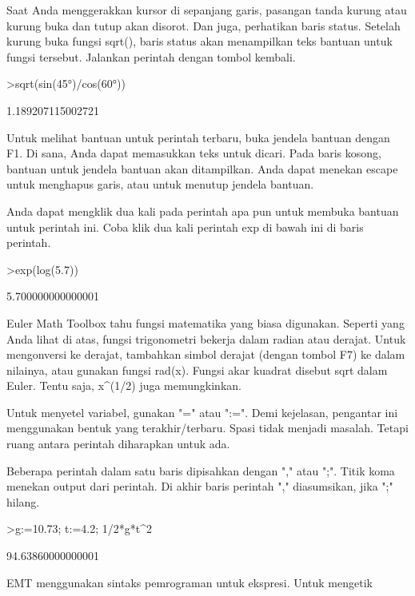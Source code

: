 \documentclass[a4paper,10pt]{article}
\begin{document}
\begin{eulernotebook}
\begin{eulercomment}
\begin{eulercomment}
\begin{eulercomment}
Saat Anda menggerakkan kursor di sepanjang garis, pasangan tanda
kurung atau kurung buka dan tutup akan disorot. Dan juga, perhatikan
baris status. Setelah kurung buka fungsi sqrt(), baris status akan
menampilkan teks bantuan untuk fungsi tersebut. Jalankan perintah
dengan tombol kembali.
\end{eulercomment}
\begin{eulerprompt}
>sqrt(sin(45°)/cos(60°))
\end{eulerprompt}
\begin{euleroutput}
  1.189207115002721
\end{euleroutput}
\begin{eulercomment}
Untuk melihat bantuan untuk perintah terbaru, buka jendela bantuan
dengan F1. Di sana, Anda dapat memasukkan teks untuk dicari. Pada
baris kosong, bantuan untuk jendela bantuan akan ditampilkan. Anda
dapat menekan escape untuk menghapus garis, atau untuk menutup jendela
bantuan.

Anda dapat mengklik dua kali pada perintah apa pun untuk membuka
bantuan untuk perintah ini. Coba klik dua kali perintah exp di bawah
ini di baris perintah.
\end{eulercomment}
\begin{eulerprompt}
>exp(log(5.7))
\end{eulerprompt}
\begin{euleroutput}
  5.700000000000001
\end{euleroutput}
\begin{eulercomment}
\end{eulercomment}
\begin{eulercomment}
Euler Math Toolbox tahu fungsi matematika yang biasa digunakan.
Seperti yang Anda lihat di atas, fungsi trigonometri bekerja dalam
radian atau derajat. Untuk mengonversi ke derajat, tambahkan simbol
derajat (dengan tombol F7) ke dalam nilainya, atau gunakan fungsi
rad(x). Fungsi akar kuadrat disebut sqrt dalam Euler. Tentu saja,
x\textasciicircum{}(1/2) juga memungkinkan.

Untuk menyetel variabel, gunakan "=" atau ":=". Demi kejelasan,
pengantar ini menggunakan bentuk yang terakhir/terbaru. Spasi tidak
menjadi masalah. Tetapi ruang antara perintah diharapkan untuk ada.

Beberapa perintah dalam satu baris dipisahkan dengan "," atau ";".
Titik koma menekan output dari perintah. Di akhir baris perintah ","
diasumsikan, jika ";" hilang.
\end{eulercomment}
\begin{eulerprompt}
>g:=10.73; t:=4.2; 1/2*g*t^2
\end{eulerprompt}
\begin{euleroutput}
  94.63860000000001
\end{euleroutput}
\begin{eulercomment}
EMT menggunakan sintaks pemrograman untuk ekspresi. Untuk mengetik


\end{eulercomment}
\end{eulercomment}
\end{eulercomment}
\end{eulernotebook}
\end{document}
